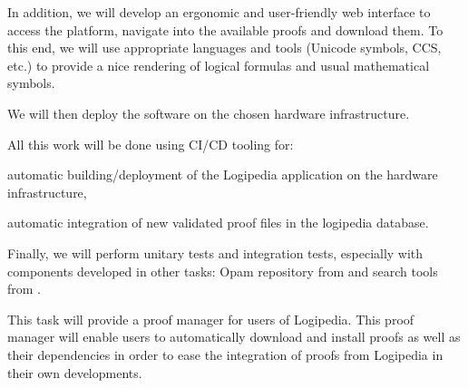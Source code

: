 \begin{workpackage}[id=access,type=RTD,wphases=1-48,
  short=Access,%
  title={Access},
  lead=Inr,InrRM=48,OcaRM=6,EduRM=12]
\begin{tasklist}
\begin{task}[id=web,
      title=Giving access to the infrastructure on the world-wide web,
      shorttitle=Web,
      lead=Inr,InrRM=12,wphases=7-24]
    In addition, we will develop an ergonomic and user-friendly web
    interface to access the platform, navigate into the available
    proofs and download them. To this end, we will use appropriate
    languages and tools (Unicode symbols, CCS, etc.) to provide a nice
    rendering of logical formulas and usual mathematical symbols.
    
    We will then deploy the software on the chosen hardware
    infrastructure.

    All this work will be done using CI/CD tooling for:
    \begin{compactitem}
    \item automatic building/deployment of the Logipedia application
      on the hardware infrastructure,
    \item automatic integration of new validated proof files in the
      logipedia database.
    \end{compactitem}

    Finally, we will perform unitary tests and integration tests,
    especially with components developed in other tasks: Opam
    repository from  and search tools from
    .
  \end{task}

  \begin{task}[id=opam,
      title=Giving access to the infrastructure in proof systems,
      shorttitle=Syst.,
      lead=Oca,OcaRM=6,wphases=15-24]
    This task will provide a proof manager for users of Logipedia. This proof
    manager will enable users to automatically download and install
    proofs as well as their dependencies in order to ease the
    integration of proofs from Logipedia in their own developments.


\end{task}
\end{tasklist}
\end{workpackage}
